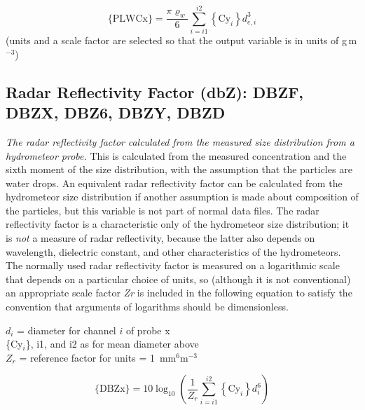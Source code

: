 \documentclass[
]{book}
\begin{document}
\begin{equation}
\mathrm{\{PLWCx\}}=\frac{\pi\varrho_{w}}{6}{\textstyle \sum_{i=i1}^{i2}}{\displaystyle {\displaystyle \left\{ \mathrm{Cy}_{i}\right\} d_{e,i}^{3}}}
\label{eq:LWCbox}
\end{equation}
(units and a scale factor are selected so that the output variable
is in units of g\(\,\)m\(^{-3}\))

\hypertarget{DBZ}{%
\subsection*{Radar Reflectivity Factor (dbZ): DBZF, DBZX, DBZ6, DBZY, DBZD}\label{DBZ}}

\emph{The radar reflectivity factor} \emph{calculated from the measured size distribution from a hydrometeor probe.} This is calculated from the measured concentration and the sixth moment of the size distribution, with the assumption that the particles are water drops. An equivalent radar reflectivity factor can be calculated from the hydrometeor size distribution if another assumption is made about composition of the particles, but this variable is not part of normal data files. The radar reflectivity factor is a characteristic only of the hydrometeor size distribution; it is \emph{not} a measure of radar reflectivity, because the latter also depends on wavelength, dielectric constant, and other characteristics of the hydrometeors. The normally used radar reflectivity factor is measured on a logarithmic scale that depends on a particular choice of units, so (although it is not conventional) an appropriate scale factor {\emph{Z}\emph{r}} is included in the following equation to satisfy the convention that arguments of logarithms should be dimensionless.

\(d_{i}\) = diameter for channel \(i\) of probe x\\
\{Cy\(_{i}\)\}, i1, and i2 as for mean diameter above\\
\(Z_{r}\) = reference factor for units = 1~mm\(^{6}\)m\(^{-3}\)

\begin{equation}
\mathrm{\{DBZx\}}=10\log_{10}\left({\textstyle \frac{1}{Z_{r}}\sum_{i=i1}^{i2}}{\displaystyle {\displaystyle \left\{ \mathrm{Cy}_{i}\right\} d_{i}^{6}}}\right)
\label{eq:DBZbox}
\end{equation}
\end{document}
